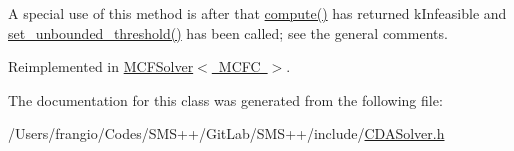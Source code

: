A special use of this method is after that \mbox{\hyperlink{class_s_m_spp__di__unipi__it_1_1_solver_a504d4e3e174c7a518cc66156a8a45ce5}{compute()}} has returned k\+Infeasible and \mbox{\hyperlink{class_s_m_spp__di__unipi__it_1_1_solver_ae1717d1363782e086aa797e7437c0352}{set\+\_\+unbounded\+\_\+threshold()}} has been called; see the general comments. 

Reimplemented in \mbox{\hyperlink{class_s_m_spp__di__unipi__it_1_1_m_c_f_solver_aa78ff49c515c8c6e2da6216d104dc219}{M\+C\+F\+Solver$<$ M\+C\+F\+C $>$}}.



The documentation for this class was generated from the following file\+:\begin{DoxyCompactItemize}
\item 
/\+Users/frangio/\+Codes/\+S\+M\+S++/\+Git\+Lab/\+S\+M\+S++/include/\mbox{\hyperlink{_c_d_a_solver_8h}{C\+D\+A\+Solver.\+h}}\end{DoxyCompactItemize}
